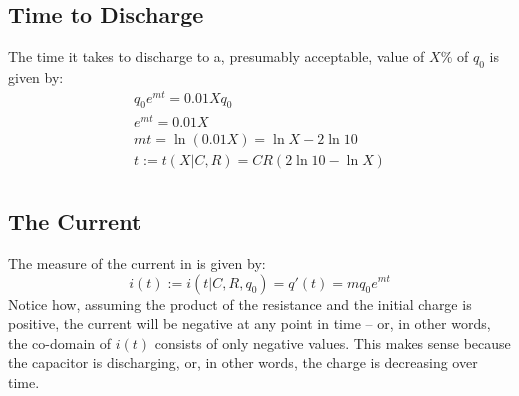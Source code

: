 \documentclass{article}
\begin{document}
	\subsection[Duration]{Time to Discharge}
	The time it takes to discharge to a, presumably acceptable, value of 
	$X\text{\%}$ of $q_0$ is given by:
	\begin{gather*}
	    q_0e^{mt} = 0.01Xq_0\\
	    e^{mt} = 0.01X\\
	    mt = \ln(0.01X) = \ln X - 2\ln 10\\
	    t := t(X \vert C, R) = CR(2\ln 10 - \ln X)\\
	\end{gather*}
	\subsection[Current]{The Current}
	The measure of the current in is given by:
	\[ i(t) := i(t\vert C, R, q_0) = q'(t) = mq_0e^{mt}\]
	Notice how, assuming the product of the resistance and the initial charge 
	is positive, the current will be negative at any point in time -- or, in 
	other words, the co-domain of $i(t)$ consists of only negative values.  
	This makes sense because the capacitor is discharging, or, in other words, 
	the charge is decreasing over time.
\end{document}
